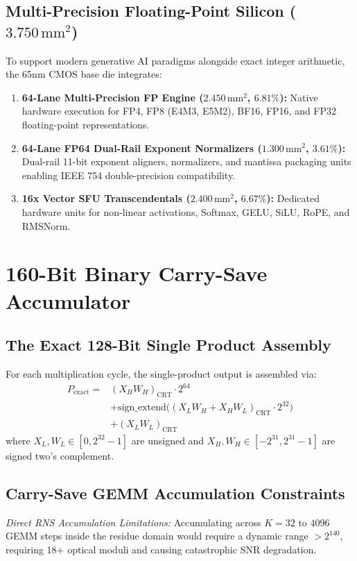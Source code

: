 \documentclass[10pt,journal,compsoc]{IEEEtran}
\begin{document}
\subsection{Multi-Precision Floating-Point Silicon ($3.750\,\text{mm}^2$)}
To support modern generative AI paradigms alongside exact integer arithmetic, the 65nm CMOS base die integrates:
\begin{enumerate}
    \item \textbf{64-Lane Multi-Precision FP Engine ($2.450\,\text{mm}^2$, $6.81\%$):} Native hardware execution for FP4, FP8 (E4M3, E5M2), BF16, FP16, and FP32 floating-point representations.
    \item \textbf{64-Lane FP64 Dual-Rail Exponent Normalizers ($1.300\,\text{mm}^2$, $3.61\%$):} Dual-rail 11-bit exponent aligners, normalizers, and mantissa packaging units enabling IEEE 754 double-precision compatibility.
    \item \textbf{16x Vector SFU Transcendentals ($2.400\,\text{mm}^2$, $6.67\%$):} Dedicated hardware units for non-linear activations, Softmax, GELU, SiLU, RoPE, and RMSNorm.
\end{enumerate}

\section{160-Bit Binary Carry-Save Accumulator}\label{sec:accumulator}

\subsection{The Exact 128-Bit Single Product Assembly}
For each multiplication cycle, the single-product output is assembled via:
\begin{align}
P_{\text{exact}} = &(X_H W_H)_{\text{CRT}} \cdot 2^{64} \nonumber \\
&+ \text{sign\_extend}\Big( (X_L W_H + X_H W_L)_{\text{CRT}} \cdot 2^{32} \Big) \nonumber \\
&+ (X_L W_L)_{\text{CRT}}
\end{align}
where $X_L, W_L \in [0, 2^{32}-1]$ are unsigned and $X_H, W_H \in [-2^{31}, 2^{31}-1]$ are signed two's complement.

\subsection{Carry-Save GEMM Accumulation Constraints}
\textit{Direct RNS Accumulation Limitations:} Accumulating across $K = 32\text{ to }4096$ GEMM steps inside the residue domain would require a dynamic range $> 2^{140}$, requiring 18+ optical moduli and causing catastrophic SNR degradation.
\end{document}
